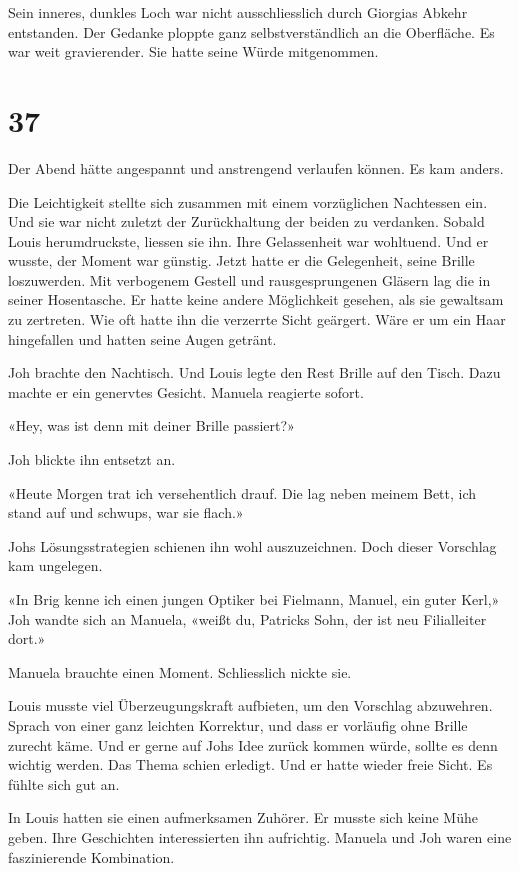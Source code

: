 Sein inneres, dunkles Loch war nicht ausschliesslich durch Giorgias
Abkehr entstanden. Der Gedanke ploppte ganz selbstverständlich an die
Oberfläche. Es war weit gravierender. Sie hatte seine Würde mitgenommen.

\chapter{37}\label{section-36}

Der Abend hätte angespannt und anstrengend verlaufen können. Es kam
anders.

Die Leichtigkeit stellte sich zusammen mit einem vorzüglichen Nachtessen
ein. Und sie war nicht zuletzt der Zurückhaltung der beiden zu
verdanken. Sobald Louis herumdruckste, liessen sie ihn. Ihre
Gelassenheit war wohltuend. Und er wusste, der Moment war günstig. Jetzt
hatte er die Gelegenheit, seine Brille loszuwerden. Mit verbogenem
Gestell und rausgesprungenen Gläsern lag die in seiner Hosentasche. Er
hatte keine andere Möglichkeit gesehen, als sie gewaltsam zu zertreten.
Wie oft hatte ihn die verzerrte Sicht geärgert. Wäre er um ein Haar
hingefallen und hatten seine Augen getränt.

Joh brachte den Nachtisch. Und Louis legte den Rest Brille auf den
Tisch. Dazu machte er ein genervtes Gesicht. Manuela reagierte sofort.

«Hey, was ist denn mit deiner Brille passiert?»

Joh blickte ihn entsetzt an.

«Heute Morgen trat ich versehentlich drauf. Die lag neben meinem Bett,
ich stand auf und schwups, war sie flach.»

Johs Lösungsstrategien schienen ihn wohl auszuzeichnen. Doch dieser
Vorschlag kam ungelegen.

«In Brig kenne ich einen jungen Optiker bei Fielmann, Manuel, ein guter
Kerl,» Joh wandte sich an Manuela, «weißt du, Patricks Sohn, der ist neu
Filialleiter dort.»

Manuela brauchte einen Moment. Schliesslich nickte sie.

Louis musste viel Überzeugungskraft aufbieten, um den Vorschlag
abzuwehren. Sprach von einer ganz leichten Korrektur, und dass er
vorläufig ohne Brille zurecht käme. Und er gerne auf Johs Idee zurück
kommen würde, sollte es denn wichtig werden. Das Thema schien erledigt.
Und er hatte wieder freie Sicht. Es fühlte sich gut an.

In Louis hatten sie einen aufmerksamen Zuhörer. Er musste sich keine
Mühe geben. Ihre Geschichten interessierten ihn aufrichtig. Manuela und
Joh waren eine faszinierende Kombination.

